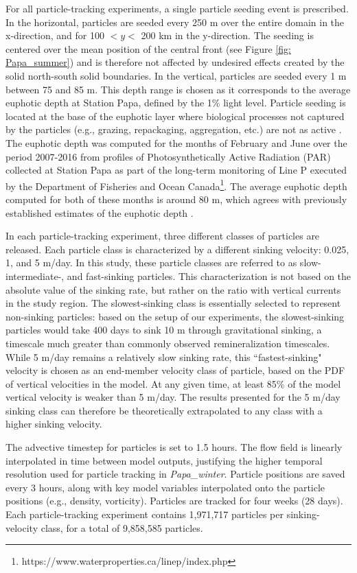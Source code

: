 \documentclass[article,linenumbers]{agujournal2019}
\begin{document}
	For all particle-tracking experiments, a single particle seeding event is prescribed. In the horizontal, particles are seeded every 250 m over the entire domain in the x-direction, and for 100 $<y<$ 200 km in the y-direction. The seeding is centered over the mean position of the central front (see Figure \ref{fig: Papa_summer}) and is therefore not affected by undesired effects created by the solid north-south solid boundaries. In the vertical, particles are seeded every 1 m between 75 and 85 m. This depth range is chosen as it corresponds to the average euphotic depth at Station Papa, defined by the 1\% light level. Particle seeding is located at the base of the euphotic layer where biological processes not captured by the particles (e.g., grazing, repackaging, aggregation, etc.) are not as active \cite{Duclow_2001}.
	The euphotic depth was computed for the months of February and June over the period 2007-2016 from profiles of Photosynthetically Active Radiation (PAR) collected at Station Papa as part of the long-term monitoring of Line P executed by the Department of Fisheries and Ocean Canada\footnote{https://www.waterproperties.ca/linep/index.php}. The average euphotic depth computed for both of these months is around 80 m, which agrees with previously established estimates of the euphotic depth \cite{Sherry_1999,Harrison_2004}.

	In each particle-tracking experiment, three different classes of particles are released. Each particle class is characterized by a different sinking velocity: 0.025, 1, and 5 m/day. In this study, these particle classes are referred to as slow- intermediate-, and fast-sinking particles. This characterization is not based on the absolute value of the sinking rate, but rather on the ratio with vertical currents in the study region. The slowest-sinking class is essentially selected to represent non-sinking particles: based on the setup of our experiments, the slowest-sinking particles would take 400 days to sink 10 m through gravitational sinking, a timescale much greater than commonly observed remineralization timescales. While 5 m/day remains a relatively slow sinking rate, this ``fastest-sinking" velocity is chosen as an end-member velocity class of particle, based on the PDF of vertical velocities in the model. At any given time, at least 85\% of the model vertical velocity is weaker than 5 m/day. The results presented for the 5 m/day sinking class can therefore be theoretically extrapolated to any class with a higher sinking velocity.

	The advective timestep for particles is set to 1.5 hours. The flow field is linearly interpolated in time between model outputs, justifying the higher temporal resolution used for particle tracking in \textit{Papa\_winter}. Particle positions are saved every 3 hours, along with key model variables interpolated onto the particle positions (e.g., density, vorticity). Particles are tracked for four weeks (28 days). Each particle-tracking experiment contains 1,971,717 particles per sinking-velocity class, for a total of 9,858,585 particles. %
\end{document}
